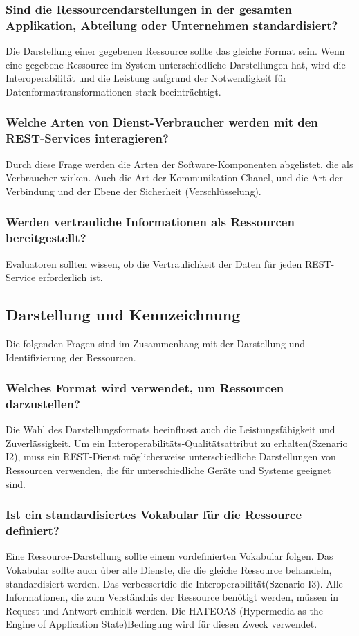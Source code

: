 \documentclass{acmsiggraph}
\begin{document}
\subsubsection{Sind die Ressourcendarstellungen in der gesamten Applikation, Abteilung oder Unternehmen standardisiert?}
Die Darstellung einer gegebenen Ressource sollte das gleiche Format sein.
Wenn eine gegebene Ressource im System unterschiedliche Darstellungen hat, wird die Interoperabilität und die Leistung aufgrund der Notwendigkeit für Datenformattransformationen stark beeinträchtigt.
\subsubsection{Welche Arten von Dienst-Verbraucher werden mit den REST-Services interagieren?}
Durch diese Frage werden die Arten der Software-Komponenten abgelistet, die als Verbraucher wirken.
Auch die Art der Kommunikation Chanel, und die Art der Verbindung und der Ebene der Sicherheit (Verschlüsselung).
\subsubsection{Werden vertrauliche Informationen als Ressourcen bereitgestellt?}
Evaluatoren sollten wissen, ob die Vertraulichkeit der Daten für jeden REST-Service erforderlich ist.


\subsection{Darstellung und Kennzeichnung}
Die folgenden Fragen sind im Zusammenhang mit der Darstellung und Identifizierung der Ressourcen.
\subsubsection{Welches Format wird verwendet, um Ressourcen darzustellen?}
Die Wahl des Darstellungsformats beeinflusst auch die Leistungsfähigkeit und Zuverlässigkeit.
Um ein Interoperabilitäts-Qualitätsattribut zu erhalten(Szenario I2), muss ein REST-Dienst möglicherweise unterschiedliche Darstellungen von Ressourcen verwenden, die für unterschiedliche Geräte und Systeme geeignet sind.
\subsubsection{Ist ein standardisiertes Vokabular für die Ressource definiert?}
Eine Ressource-Darstellung sollte einem vordefinierten Vokabular folgen.
Das Vokabular sollte auch über alle Dienste, die die gleiche Ressource behandeln, standardisiert werden.
Das verbessertdie die Interoperabilität(Szenario I3). Alle Informationen, die zum Verständnis der Ressource benötigt werden, müssen in Request und Antwort enthielt werden. Die HATEOAS (Hypermedia as the Engine of Application State)Bedingung wird für diesen Zweck verwendet.
\end{document}
